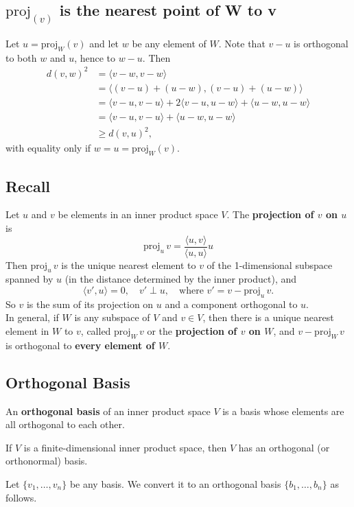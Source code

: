 \documentclass[a4paper, 9pt]{extarticle}
\begin{document}
\subsection{$\text{proj}_{(v)}$ is the nearest point of W to v}
Let $u = \text{proj}_W(v)$ and let $w$ be any element of $W$.
Note that $v - u$ is orthogonal to both $w$ and $u$, hence to $w - u$. Then
\begin{align*}
  d(v, w)^2 & = \langle v - w, v - w \rangle                                                                 \\
            & = \langle (v - u) + (u - w), (v - u) + (u - w) \rangle                                         \\
            & = \langle v - u, v - u \rangle + 2 \langle v - u, u - w \rangle + \langle u - w, u - w \rangle \\
            & = \langle v - u, v - u \rangle + \langle u - w, u - w \rangle                                  \\
            & \geq d(v, u)^2,
\end{align*}
with equality only if $w = u = \text{proj}_W(v)$.
\subsection{Recall}
Let $u$ and $v$ be elements in an inner product space $V$. The \textbf{projection of $v$ on $u$} is
$$
  \text{proj}_u\,v = \frac{\langle u, v \rangle}{\langle u, u \rangle} u
$$
Then $\text{proj}_u\,v$ is the unique nearest element to $v$ of the 1-dimensional subspace spanned by $u$ (in the distance determined by the inner product), and
$$
  \langle v', u \rangle = 0,\quad v' \perp u,\quad \text{where } v' = v - \text{proj}_u\,v.
$$
So $v$ is the sum of its projection on $u$ and a component orthogonal to $u$. \\[2ex]
In general, if $W$ is any subspace of $V$ and $v \in V$, then there is a unique nearest element in $W$ to $v$, called $\text{proj}_W\,v$ or the \textbf{projection of $v$ on $W$},
and $v - \text{proj}_W\,v$ is orthogonal to \textbf{every element of $W$}.
\subsection{Orthogonal Basis}
An \textbf{orthogonal basis} of an inner product space $V$ is a basis whose elements are all orthogonal to each other.
\begin{theorembox}{}{}
  If $V$ is a finite-dimensional inner product space, then $V$ has an orthogonal (or orthonormal) basis.
\end{theorembox}
\noindent Let $\{v_1, \dots, v_n\}$ be any basis. We convert it to an orthogonal basis $\{b_1, \dots, b_n\}$ as follows.
\end{document}
